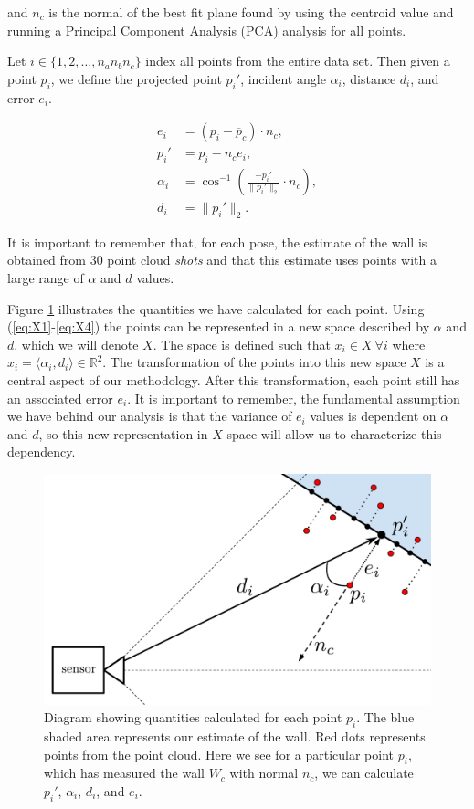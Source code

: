 \noindent and $n_c$ is the normal of the best fit plane found by using the centroid value and running a Principal Component Analysis (PCA) analysis for all points. 

Let $i\in\{1,2,\dots,n_an_bn_c\}$ index all points from the entire data set. Then given a point $p_i$, we define the projected point $p_i'$, incident angle $\alpha_i$, distance $d_i$, and error $e_i$. 

{
\setlength\abovedisplayskip{-5pt} \setlength\belowdisplayskip{-4pt} %
\begin{align}
e_i & = (p_i-\overline{p}_c)\cdotp n_c \label{eq:X1}, \\ 
p_i' &= p_i-n_ce_i \label{eq:X2}, \\
\alpha_i & =\cos^{-1}\left(\frac{-p_i'}{\|p_i'\|_2}\cdotp n_c\right) \label{eq:X3}, \\
d_i & =\|p_i'\|_2 \label{eq:X4} .
\end{align}
}

\noindent %
It is important to remember that, for each pose, the estimate of the wall is obtained from 30 point cloud \emph{shots} and that this estimate uses points with a large range of $\alpha$ and $d$ values. 

Figure \ref{fig:exp_diagram} illustrates the quantities we have calculated for
each point. Using  (\ref{eq:X1}-\ref{eq:X4}) the points can be represented in a new space
described by $\alpha$ and $d$, which we will denote $X$. The space is defined
such that $x_i \in X \ \forall i$ where $x_i=\langle \alpha_i,d_i\rangle \in \mathbb{R}^2$.
The transformation of the points into this new space $X$ is a central aspect of
our methodology. After this transformation, each point still has an associated
error $e_i$. It is important to remember, the fundamental assumption we have behind
our analysis is that the variance of $e_i$ values is dependent on $\alpha$ and
$d$, so this new representation in $X$ space will allow us to characterize this
dependency. 

\begin{figure}[t]
\centering
\includegraphics[width=.45\textwidth]{img/ExpDiagram.pdf}
\caption{Diagram showing quantities calculated for each point $p_i$. The blue shaded area represents our estimate of the wall. Red dots represents points from the point cloud. Here we see for a particular point $p_i$, which has measured the wall $W_c$ with normal $n_c$, we can calculate $p_i'$, $\alpha_i$, $d_i$, and $e_i$.}
\label{fig:exp_diagram}
\end{figure} 

